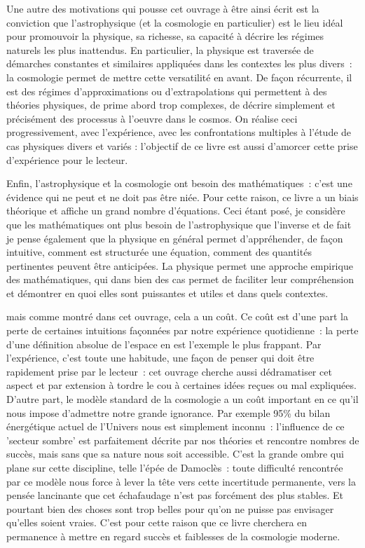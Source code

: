 Une autre des motivations qui pousse cet ouvrage à être ainsi écrit est la conviction que l'astrophysique (et la cosmologie en particulier) est le lieu idéal pour promouvoir la physique, sa richesse, sa capacité à décrire les régimes naturels les plus inattendus. En particulier, la physique est traversée de démarches constantes et similaires appliquées dans les contextes les plus divers~: la cosmologie permet de mettre cette versatilité en avant. De façon récurrente, il est des régimes d'approximations ou d'extrapolations qui permettent à des théories physiques, de prime abord trop complexes, de décrire simplement et précisément des processus à l'oeuvre dans le cosmos. On réalise ceci progressivement, avec l'expérience, avec les confrontations multiples à l'étude de cas physiques divers et variés : l'objectif de ce livre est aussi d'amorcer cette prise d'expérience pour le lecteur.

Enfin, l'astrophysique et la cosmologie ont besoin des mathématiques~: c'est une évidence qui ne peut et ne doit pas être niée. Pour cette raison, ce livre a un biais théorique et affiche un grand nombre d'équations. Ceci étant posé, je considère que les mathématiques ont plus besoin de l'astrophysique que l'inverse et de fait je pense également que la physique en général permet d'appréhender, de façon intuitive, comment est structurée une équation, comment des quantités pertinentes peuvent être anticipées. La physique permet une approche empirique des mathématiques, qui dans bien des cas permet de faciliter leur compréhension et démontrer en quoi elles sont puissantes et utiles et dans quels contextes.

 mais comme montré dans cet ouvrage, cela a un coût. Ce coût est d'une part la perte de certaines intuitions façonnées par notre expérience quotidienne~: la perte d'une définition absolue de l'espace en est l'exemple le plus frappant. Par l'expérience, c'est toute une habitude, une façon de penser qui doit être rapidement prise par le lecteur~: cet ouvrage cherche aussi dédramatiser cet aspect et par extension à tordre le cou à certaines idées reçues ou mal expliquées. D'autre part, le modèle standard de la cosmologie a un coût important en ce qu'il nous impose d'admettre notre grande ignorance. Par exemple 95\% du bilan énergétique actuel de l'Univers nous est simplement inconnu~: l'influence de ce 'secteur sombre' est parfaitement décrite par nos théories et rencontre nombres de succès, mais sans que sa nature nous soit accessible. C'est la grande ombre qui plane sur cette discipline, telle l'épée de Damoclès~: toute difficulté rencontrée par ce modèle nous force à lever la tête vers cette incertitude permanente, vers la pensée lancinante que cet échafaudage n'est pas forcément des plus stables. Et pourtant bien des choses sont trop belles pour qu'on ne puisse pas envisager qu'elles soient vraies. C'est pour cette raison que ce livre cherchera en permanence à mettre en regard succès et faiblesses de la cosmologie moderne.

